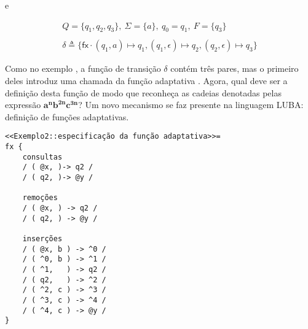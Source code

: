 \noindent e

	\begin{align*}
	Q = \{q_1, q_2, q_3\},\ \Sigma = \{a\},\ q_0 = q_1,\ F = \{q_3\} \\
	\\
	\delta \triangleq \{ \mathsf{fx}\cdot(q_1, a) \mapsto q_1,  (q_1, \epsilon) \mapsto q_2,  (q_2, \epsilon) \mapsto q_3 \} \tag{i}\label{d2-transicoes}
	\end{align*}

\noindent
Como no exemplo , a função de transição  $\delta$ contém três pares, mas o primeiro deles introduz uma chamada da função adaptativa . Agora, qual deve ser a definição desta função de modo que  reconheça as cadeias denotadas pelas expressão $\mathbf{a^nb^{2n}c^{3n}}$? Um novo mecanismo se faz presente na linguagem LUBA: definição de funções adaptativas.


\begin{lstlisting}
<<Exemplo2::especificação da função adaptativa>>=
fx {
    consultas
    / ( @x, )-> q2 /
    / ( q2, )-> @y /

    remoções
    / ( @x, ) -> q2 /
    / ( q2, ) -> @y /

    inserções
    / ( @x, b ) -> ^0 /
    / ( ^0, b ) -> ^1 /
    / ( ^1,   ) -> q2 /
    / ( q2,   ) -> ^2 /
    / ( ^2, c ) -> ^3 /
    / ( ^3, c ) -> ^4 /
    / ( ^4, c ) -> @y /
}
\end{lstlisting}
